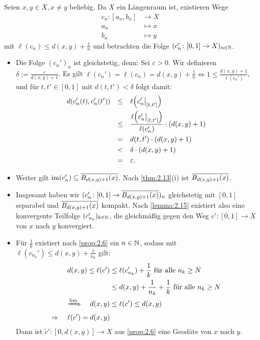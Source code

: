 \begin{beweis}
	Seien $x,y \in X, x\neq y$ beliebig.
	Da $X$ ein Längenraum ist, existieren Wege
	\begin{align*}
		c_n\colon [a_n,b_n] &\longrightarrow X \\
		a_n &\longmapsto x \\
		b_n &\longmapsto y
	\end{align*}
	mit $\ell(c_n) \leq d(x,y) + \frac{1}{n}$ und betrachten die Folge $(c_n'\colon [0,1] \rightarrow X)_{n \in \mathbb{N}}$.
	\begin{itemize}
		\item Die Folge $(c_n')_n$ ist gleichstetig, denn:
		Sei $\varepsilon > 0$.
		Wir definieren $\delta := \frac{\varepsilon}{d(x,y)+1}$. Es gilt $\ell(c_n') = \ell(c_n) = d(x,y) + \frac{1}{n} \Leftrightarrow 1 \leq \frac{d(x,y)+1}{\ell(c_n')}$, und für $t,t' \in [0,1]$ mit $d(t,t') < \delta$ folgt damit:
		\begin{align*}
			d(c_n'(t),c_n'(t')) &\stack{}{\leq} \ell \enbrace*{c_n' \big|_{[t,t']}} \\
			&\stack{}{\leq} \frac{\ell \enbrace*{c_n' \big|_{[t,t']}}}{\ell(c_n')} \cdot (d(x,y) + 1) \\
			&\stack{}{=} d(t,t') \cdot (d(x,y) + 1) \\
			&\stack{}{<} \delta \cdot (d(x,y) + 1) \\
			&\stack{}{=} \varepsilon.
		\end{align*}
		\item Weiter gilt $\operatorname{im}(c_n') \subseteq \overline{B_{d(x,y)+1}(x)}$.
		Nach \autoref{thm:2.13}(i) ist $\overline{B_{d(x,y)+1}(x)}$.
		\item Insgesamt haben wir $(c_n'\colon [0,1] \rightarrow \overline{B_{d(x,y)+1}(x)})_n$ gleichstetig mit $[0,1]$ separabel und $\overline{B_{d(x,y)+1}(x)}$ kompakt.
		Nach \autoref{lemma:2.15} existiert also eine konvergente Teilfolge $(c_{n_k}')_{k \in \mathbb{N}}$, die gleichmäßig gegen den Weg $c'\colon [0,1] \rightarrow X$ von $x$ nach $y$ konvergiert.
		\item Für $\frac{1}{k}$ existiert nach \autoref{prop:2.6} ein $n \in \mathbb{N}$, sodass mit $\ell(c_{n_k}') \leq  d(x,y) + \frac{1}{n_k}$ gilt:
		\begin{align*}
			d(x,y) \leq \ell(c') &\leq \ell(c_{n_k}') + \frac{1}{k} \text{ für alle } n_k \geq N \\
			&\leq d(x,y) + \frac{1}{n_k} + \frac{1}{k} \text{ für alle } n_k \geq N \\
			\xRightarrow{\lim} \quad d(x,y) &\leq \ell(c') \leq d(x,y) \\
			\Rightarrow \quad \ell(c') = d(x,y)
		\end{align*}
		Dann ist $\tilde{c}' \colon [0,d(x,y)] \rightarrow X$ aus \autoref{prop:2.6} eine Geodäte von $x$ nach $y$. \qedhere
	\end{itemize}
\end{beweis}

